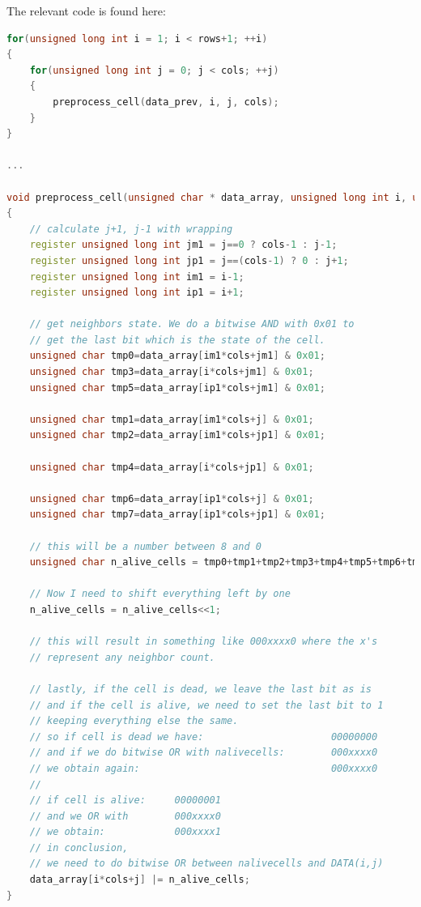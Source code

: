 \documentclass{report}
\begin{document}
The relevant code is found here:
\begin{lstlisting}[language=C++]
for(unsigned long int i = 1; i < rows+1; ++i)
{
    for(unsigned long int j = 0; j < cols; ++j)
    {
        preprocess_cell(data_prev, i, j, cols);
    }
}

...
 
void preprocess_cell(unsigned char * data_array, unsigned long int i, unsigned long int j, unsigned long int cols)
{
    // calculate j+1, j-1 with wrapping
    register unsigned long int jm1 = j==0 ? cols-1 : j-1;
    register unsigned long int jp1 = j==(cols-1) ? 0 : j+1;
    register unsigned long int im1 = i-1;
    register unsigned long int ip1 = i+1;

    // get neighbors state. We do a bitwise AND with 0x01 to  
    // get the last bit which is the state of the cell.
    unsigned char tmp0=data_array[im1*cols+jm1] & 0x01;
    unsigned char tmp3=data_array[i*cols+jm1] & 0x01;
    unsigned char tmp5=data_array[ip1*cols+jm1] & 0x01;

    unsigned char tmp1=data_array[im1*cols+j] & 0x01;
    unsigned char tmp2=data_array[im1*cols+jp1] & 0x01;

    unsigned char tmp4=data_array[i*cols+jp1] & 0x01;

    unsigned char tmp6=data_array[ip1*cols+j] & 0x01;
    unsigned char tmp7=data_array[ip1*cols+jp1] & 0x01;

    // this will be a number between 8 and 0
    unsigned char n_alive_cells = tmp0+tmp1+tmp2+tmp3+tmp4+tmp5+tmp6+tmp7;

    // Now I need to shift everything left by one
    n_alive_cells = n_alive_cells<<1;

    // this will result in something like 000xxxx0 where the x's 
    // represent any neighbor count.

    // lastly, if the cell is dead, we leave the last bit as is 
    // and if the cell is alive, we need to set the last bit to 1
    // keeping everything else the same. 
    // so if cell is dead we have:                      00000000
    // and if we do bitwise OR with nalivecells:        000xxxx0 
    // we obtain again:                                 000xxxx0 
    //
    // if cell is alive:     00000001
    // and we OR with        000xxxx0
    // we obtain:            000xxxx1
    // in conclusion,
    // we need to do bitwise OR between nalivecells and DATA(i,j)
    data_array[i*cols+j] |= n_alive_cells;
}
\end{lstlisting}
\end{document}
